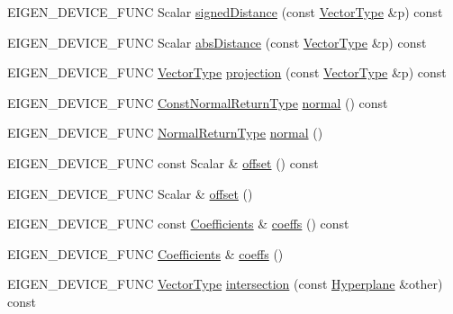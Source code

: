 \begin{DoxyCompactItemize}
\item 
E\+I\+G\+E\+N\+\_\+\+D\+E\+V\+I\+C\+E\+\_\+\+F\+U\+NC Scalar \mbox{\hyperlink{class_eigen_1_1_hyperplane_a928f4f8a7c2eb339fe8c931824d0a8c8}{signed\+Distance}} (const \mbox{\hyperlink{class_eigen_1_1_matrix}{Vector\+Type}} \&p) const
\item 
E\+I\+G\+E\+N\+\_\+\+D\+E\+V\+I\+C\+E\+\_\+\+F\+U\+NC Scalar \mbox{\hyperlink{class_eigen_1_1_hyperplane_a95047840f0caed0bcb4f3ead9215d7b8}{abs\+Distance}} (const \mbox{\hyperlink{class_eigen_1_1_matrix}{Vector\+Type}} \&p) const
\item 
E\+I\+G\+E\+N\+\_\+\+D\+E\+V\+I\+C\+E\+\_\+\+F\+U\+NC \mbox{\hyperlink{class_eigen_1_1_matrix}{Vector\+Type}} \mbox{\hyperlink{class_eigen_1_1_hyperplane_af74c608806686a6bd2a96a8d7e5e0247}{projection}} (const \mbox{\hyperlink{class_eigen_1_1_matrix}{Vector\+Type}} \&p) const
\item 
E\+I\+G\+E\+N\+\_\+\+D\+E\+V\+I\+C\+E\+\_\+\+F\+U\+NC \mbox{\hyperlink{class_eigen_1_1_block}{Const\+Normal\+Return\+Type}} \mbox{\hyperlink{class_eigen_1_1_hyperplane_ad3da930fc7025604f2f174651089b2a8}{normal}} () const
\item 
E\+I\+G\+E\+N\+\_\+\+D\+E\+V\+I\+C\+E\+\_\+\+F\+U\+NC \mbox{\hyperlink{class_eigen_1_1_block}{Normal\+Return\+Type}} \mbox{\hyperlink{class_eigen_1_1_hyperplane_aadb7e69a0c18d532dae200e146da4258}{normal}} ()
\item 
E\+I\+G\+E\+N\+\_\+\+D\+E\+V\+I\+C\+E\+\_\+\+F\+U\+NC const Scalar \& \mbox{\hyperlink{class_eigen_1_1_hyperplane_afe2eadf3679e4a802c0e02c15049aed9}{offset}} () const
\item 
E\+I\+G\+E\+N\+\_\+\+D\+E\+V\+I\+C\+E\+\_\+\+F\+U\+NC Scalar \& \mbox{\hyperlink{class_eigen_1_1_hyperplane_afd7e3b9a09ba528523ddc4bac7555dbd}{offset}} ()
\item 
E\+I\+G\+E\+N\+\_\+\+D\+E\+V\+I\+C\+E\+\_\+\+F\+U\+NC const \mbox{\hyperlink{class_eigen_1_1_matrix}{Coefficients}} \& \mbox{\hyperlink{class_eigen_1_1_hyperplane_ae9e0a6a6a2c1643a788770dd08e89b3f}{coeffs}} () const
\item 
E\+I\+G\+E\+N\+\_\+\+D\+E\+V\+I\+C\+E\+\_\+\+F\+U\+NC \mbox{\hyperlink{class_eigen_1_1_matrix}{Coefficients}} \& \mbox{\hyperlink{class_eigen_1_1_hyperplane_a78975a8404b60f9eb032a80c6827338a}{coeffs}} ()
\item 
E\+I\+G\+E\+N\+\_\+\+D\+E\+V\+I\+C\+E\+\_\+\+F\+U\+NC \mbox{\hyperlink{class_eigen_1_1_matrix}{Vector\+Type}} \mbox{\hyperlink{class_eigen_1_1_hyperplane_a9cb359548dd43991c372935f6bc3df61}{intersection}} (const \mbox{\hyperlink{class_eigen_1_1_hyperplane}{Hyperplane}} \&other) const

\end{DoxyCompactItemize}
